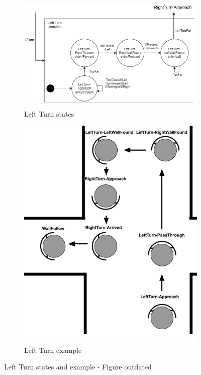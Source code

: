 \documentclass[12pt]{report}
\begin{document}
\begin{figure}[H]
  \begin{subfigure}[b]{0.55\textwidth}
    \includegraphics[width=\textwidth]{images/LeftTurnStates.png}
    \caption{Left Turn states}
    \label{fig:f5}
  \end{subfigure}
  \hfill
  \begin{subfigure}[b]{0.4\textwidth}
    \includegraphics[width=\textwidth]{images/Left Turns.png}
    \caption{Left Turn example}
    \label{fig:f6}
  \end{subfigure}
  \caption{Left Turn states and example - Figure outdated}
\end{figure}
\end{document}
